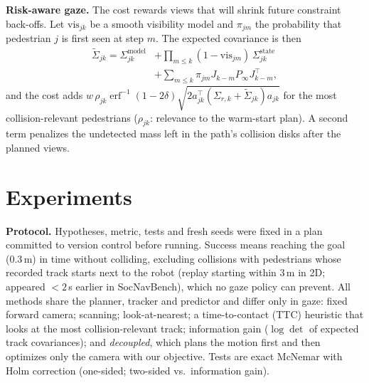 \documentclass[conference]{IEEEtran}
\begin{document}
\textbf{Risk-aware gaze.} The cost rewards views that will shrink future constraint back-offs. Let $\mathrm{vis}_{jk}$ be a smooth visibility model and $\pi_{jm}$ the probability that pedestrian $j$ is first seen at step $m$. The expected covariance is then
\begin{equation}
\begin{aligned}
\tilde\Sigma_{jk} = \Sigma^\text{model}_{jk} &+ \textstyle\prod_{m\le k}(1-\mathrm{vis}_{jm})\,\Sigma^\text{state}_{jk}\\
&+ \textstyle\sum_{m\le k}\pi_{jm} J_{k-m}P_\infty J_{k-m}^\top,
\end{aligned}
\end{equation}
and the cost adds $w\,\rho_{jk}\operatorname{erf}^{-1}(1-2\delta)\sqrt{2a_{jk}^\top(\Sigma_{r,k}+\tilde\Sigma_{jk})a_{jk}}$ for the most collision-relevant pedestrians ($\rho_{jk}$: relevance to the warm-start plan). A second term penalizes the undetected mass left in the path's collision disks after the planned views.

\section{Experiments}
\textbf{Protocol.} Hypotheses, metric, tests and fresh seeds were fixed in a plan committed to version control before running. Success means reaching the goal (0.3\,m) in time without colliding, excluding collisions with pedestrians whose recorded track starts next to the robot (replay starting within 3\,m in 2D; appeared $<2$\,s earlier in SocNavBench), which no gaze policy can prevent. All methods share the planner, tracker and predictor and differ only in gaze: fixed forward camera; scanning; look-at-nearest; a time-to-contact (TTC) heuristic that looks at the most collision-relevant track; information gain ($\log\det$ of expected track covariances); and \emph{decoupled}, which plans the motion first and then optimizes only the camera with our objective. Tests are exact McNemar with Holm correction (one-sided; two-sided vs.\ information gain).
\end{document}
